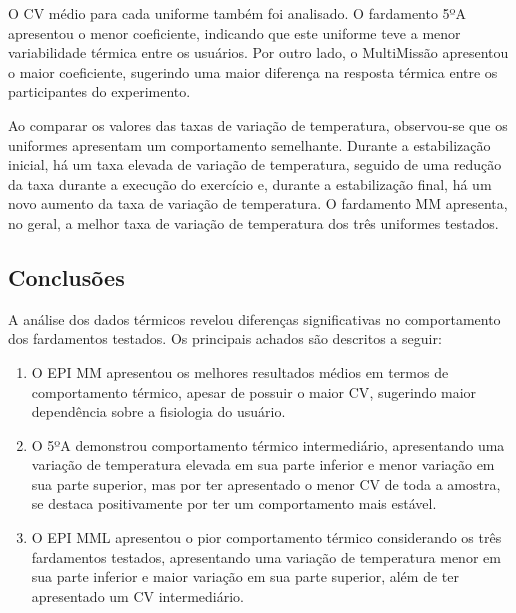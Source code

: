             O \acrlong{CV} médio para cada uniforme também foi analisado. O fardamento 5ºA apresentou 
            o menor coeficiente, indicando que este uniforme teve a menor variabilidade térmica entre 
            os usuários. Por outro lado, o MultiMissão apresentou o maior coeficiente, sugerindo uma 
            maior diferença na resposta térmica entre os participantes do experimento.

        Ao comparar os valores das taxas de variação de temperatura, observou-se que os 
        uniformes apresentam um comportamento semelhante. Durante a estabilização inicial, há um 
        taxa elevada de variação de temperatura, seguido de uma redução da taxa durante a execução do exercício 
        e, durante a estabilização final, há um novo aumento da taxa de variação de temperatura. 
        O fardamento \acrshort{MM} apresenta, no geral, a melhor taxa de variação de temperatura 
        dos três uniformes testados.

    \subsection{Conclusões}
        A análise dos dados térmicos revelou diferenças significativas no comportamento dos 
        fardamentos testados. Os principais achados são descritos a seguir:
        
        \begin{enumerate}[label=\Roman*.] %
            \item O \acrshort{EPI} \acrlong{MM} apresentou os melhores resultados médios em termos de 
            comportamento térmico, apesar de possuir o maior \acrlong{CV}, sugerindo maior dependência 
            sobre a fisiologia do usuário.
            \item O 5ºA demonstrou comportamento térmico intermediário, apresentando uma variação de 
            temperatura elevada em sua parte inferior e menor variação em sua parte superior, mas por 
            ter apresentado o menor \acrlong{CV} de toda a amostra, se destaca positivamente por ter 
            um comportamento mais estável.
            \item O \acrshort{EPI} \acrlong{MML} apresentou o pior comportamento térmico considerando os 
            três fardamentos testados, apresentando uma variação de temperatura menor em 
            sua parte inferior e maior variação em sua parte superior, além de 
            ter apresentado um \acrlong{CV} intermediário.
            \end{enumerate}   
        
